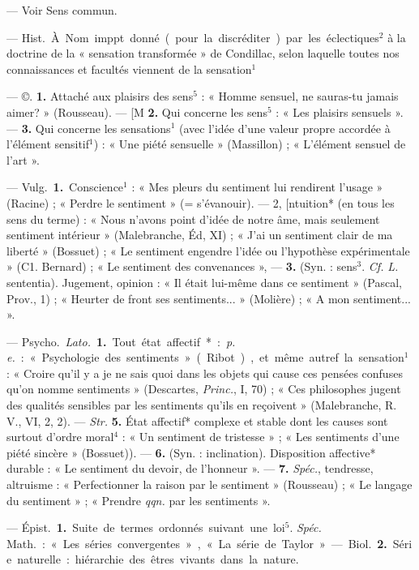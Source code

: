 \begin{itemize}[leftmargin=1cm, label=, itemsep=1pt]
 — Voir Sens commun.

 — \si{Hist.} À. Nom imppt.
donné (pour la discréditer) par les
éclectiques$^2$ à la doctrine de la « sensation transformée » de Condillac,
selon laquelle toutes nos connaissances et facultés viennent de la
sensation$^1$

 — ©. {\bf 1.} Attaché aux plaisirs
des sens$^5$ : « Homme sensuel, ne
sauras-tu jamais aimer? » (Rousseau). — [M {\bf 2.} Qui concerne les
sens$^5$ : « Les plaisirs sensuels ». —
 {\bf 3.} Qui concerne les sensations$^1$ (avec
l’idée d’une valeur propre accordée
à l'élément sensitif$^1$) : « Une piété
sensuelle » (Massillon) ; « L'élément
sensuel de l’art ».

 — \si{Vulg.} {\bf 1.} Conscience$^1$ :
« Mes pleurs du sentiment lui rendirent l’usage » (Racine) ; « Perdre le
sentiment » (= s’évanouir). — 2, [ntuition* (en tous les sens du terme) :
« Nous n’avons point d'idée de notre
âme, mais seulement sentiment intérieur » (Malebranche, Éd, XI) ;
« J’ai un sentiment clair de ma
liberté » (Bossuet) ; « Le sentiment
engendre l’idée ou l'hypothèse expérimentale » (C1. Bernard) ; « Le sentiment des convenances », — {\bf 3.} (Syn. :
sens$^3$. {\it Cf.} {\it L.} sententia). Jugement,
opinion : « Il était lui-même dans ce
sentiment » (Pascal, Prov., 1) ;
« Heurter de front ses sentiments... »
(Molière) ; « A mon sentiment... ».

— \si{Psycho.} {\it Lato.} {\bf 1.} Tout état
affectif* : {\it p. e.} : « Psychologie des
sentiments » (Ribot), et même autref. la sensation$^1$ : « Croire qu'il y
a je ne sais quoi dans les objets qui
cause ces pensées confuses qu’on
nomme sentiments » (Descartes,
{\it Princ.}, I, 70) ; « Ces philosophes
jugent des qualités sensibles par les
sentiments qu'ils en reçoivent »
(Malebranche, R. V., VI, 2, 2). —
{\it Str.} {\bf 5.} État affectif* complexe et
stable dont les causes sont surtout
d'ordre moral$^4$ : « Un sentiment de
tristesse » ; « Les sentiments d’une
piété sincère » (Bossuet)). — {\bf 6.} (Syn. :
inclination). Disposition affective*
durable : « Le sentiment du devoir,
de l'honneur ». — {\bf 7.} {\it Spéc.}, tendresse,
altruisme : « Perfectionner la raison
par le sentiment » (Rousseau) ; « Le
langage du sentiment » ; « Prendre
{\it qqn.} par les sentiments ».

 — \si{Épist.} {\bf 1.} Suite de termes
ordonnés suivant une loi$^5$. {\it Spéc.}
\si{Math.} : « Les séries convergentes »,
« La série de Taylor ». — \si{Biol.} {\bf 2.}
Série naturelle : hiérarchie des êtres
vivants dans la nature.


\end{itemize}

